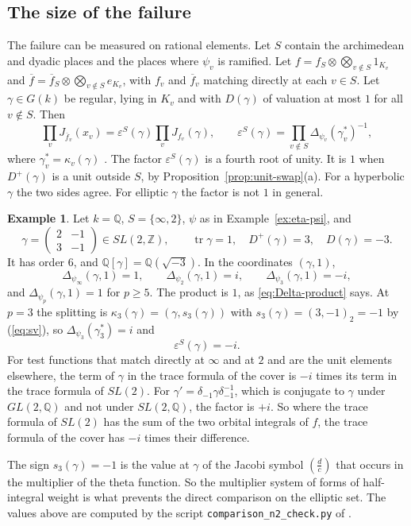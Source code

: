 \documentclass[12pt,letterpaper,openany]{book}
\theoremstyle{plain}
\theoremstyle{definition}
\newtheorem{example}[theorem]{Example}
\theoremstyle{remark}
\theoremstyle{remark}
\newcommand{\tr}{\operatorname{tr}}
\begin{document}
\subsection*{The size of the failure}

The failure can be measured on rational elements. Let $S$ contain the
archimedean and dyadic places and the places where $\psi_v$ is ramified.
Let $f=f_S\otimes\bigotimes_{v\notin S}1_{K_v}$ and
$\overline f=\overline f_S\otimes\bigotimes_{v\notin S}e_{K_v}$, with
$f_v$ and $\overline f_v$ matching directly at each $v\in S$. Let
$\gamma\in G(k)$ be regular, lying in $K_v$ and with $D(\gamma)$ of
valuation at most $1$ for all $v\notin S$. Then
\begin{equation}\label{eq:epsilon}
\prod_vJ_{\overline f_v}(x_v)=\varepsilon^S(\gamma)\prod_vJ_{f_v}(\gamma),
\qquad\varepsilon^S(\gamma)=\prod_{v\notin S}\Delta_{\psi_v}(\gamma_v^*)^{-1},
\end{equation}
where $\gamma_v^*=\kappa_v(\gamma)$ \cite[Proposition~8.8]{JC}. The
factor $\varepsilon^S(\gamma)$ is a fourth root of unity. It is $1$ when
$D^+(\gamma)$ is a unit outside $S$, by
Proposition~\ref{prop:unit-swap}(a). For a hyperbolic $\gamma$ the two
sides agree. For elliptic $\gamma$ the factor is not $1$ in general.

\begin{example}\label{ex:epsilon}
Let $k={\mathbb Q}$, $S=\{\infty,2\}$, $\psi$ as in
Example~\ref{ex:eta-psi}, and
\[
\gamma=\left(\begin{array}{cc}2&-1\\3&-1\end{array}\right)\in
SL(2,{\mathbb Z}),\qquad\tr\gamma=1,\quad D^+(\gamma)=3,\quad
D(\gamma)=-3 .
\]
It has order $6$, and ${\mathbb Q}[\gamma]={\mathbb Q}(\sqrt{-3})$. In
the coordinates $(\gamma,1)$,
\[
\Delta_{\psi_\infty}(\gamma,1)=1,\qquad\Delta_{\psi_2}(\gamma,1)=i,\qquad
\Delta_{\psi_3}(\gamma,1)=-i,
\]
and $\Delta_{\psi_p}(\gamma,1)=1$ for $p\geq5$. The product is $1$, as
\eqref{eq:Delta-product} says. At $p=3$ the splitting is
$\kappa_3(\gamma)=(\gamma,s_3(\gamma))$ with
$s_3(\gamma)=(3,-1)_2=-1$ by (\ref{eq:sv}), so
$\Delta_{\psi_3}(\gamma_3^*)=i$ and
\[
\varepsilon^S(\gamma)=-i .
\]
For test functions that match directly at $\infty$ and at $2$ and are
the unit elements elsewhere, the term of $\gamma$ in the trace formula
of the cover is $-i$ times its term in the trace formula of $SL(2)$. For
$\gamma'=\delta_{-1}\gamma\delta_{-1}^{-1}$, which is conjugate to
$\gamma$ under $GL(2,{\mathbb Q})$ and not under $SL(2,{\mathbb Q})$, the
factor is $+i$. So where the trace formula of $SL(2)$ has the sum of the
two orbital integrals of $f$, the trace formula of the cover has $-i$
times their difference.

The sign $s_3(\gamma)=-1$ is the value at $\gamma$ of the Jacobi symbol
$\left(\frac d{c}\right)$ that occurs in the multiplier of the theta
function. So the multiplier system of forms of half-integral weight is
what prevents the direct comparison on the elliptic set. The values
above are computed by the script \texttt{comparison\_n2\_check.py} of
\cite{JC}.
\end{example}
\end{document}
